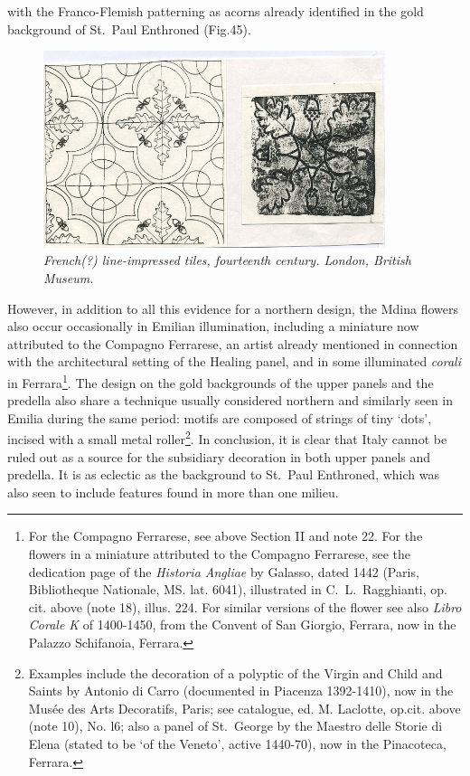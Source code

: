 \documentclass[a4paper,12pt]{article}
\begin{document}
with the Franco-Flemish patterning as acorns already identified in the
gold background of St.~Paul Enthroned (Fig.45). 
\begin{figure}[htbp]
\centering
\includegraphics[width=10cm]{pics/fig45.png}
\caption[French(?) line-impressed tiles, fourteenth century] 
{\it French(?) line-impressed tiles, fourteenth century.  London, British
Museum.}
\end{figure}
However, in addition
to all this evidence for a northern design, the Mdina flowers also
occur occasionally in Emilian illumination, including a miniature now
attributed to the Compagno Ferrarese, an artist already mentioned in
connection with the architectural setting of the Healing panel, and in
some illuminated \textit{corali} in Ferrara\footnote{For the Compagno
Ferrarese, see above Section II and note 22. For the flowers in a
miniature attributed to the Compagno Ferrarese, see the dedication
page of the \textit{Historia Angliae} by Galasso, dated 1442 (Paris,
Bibliotheque Nationale, MS. lat. 6041), illustrated in
C.~L.~Ragghianti, op. cit. above (note 18), illus. 224. For similar
versions of the flower see also \textit{Libro Corale K} of 1400-1450,
from the Convent of San Giorgio, Ferrara, now in the Palazzo
Schifanoia, Ferrara.}. The design on the gold backgrounds of the upper
panels and the predella also share a technique usually considered
northern and similarly seen in Emilia during the same period: motifs
are composed of strings of tiny `dots', incised with a small metal
roller\footnote{Examples include the decoration of a polyptic of the
Virgin and Child and Saints by Antonio di Carro (documented in
Piacenza 1392-1410), now in the Mus\'ee des Arts Decoratifs, Paris; see
catalogue, ed. M. Laclotte, op.cit. above (note 10), No. l6; also a
panel of St.~George by the Maestro delle Storie di Elena (stated to be
`of the Veneto', active 1440-70), now in the Pinacoteca, Ferrara.}. In
conclusion, it is clear that Italy cannot be ruled out as a source for
the subsidiary decoration in both upper panels and predella. It is as
eclectic as the background to St.~Paul Enthroned, which was also seen
to include features found in more than one milieu.
\end{document}
